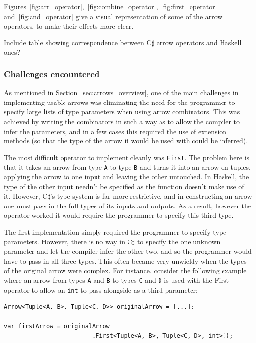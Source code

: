 \documentclass[12pt,twoside,notitlepage]{report}
\begin{document}
Figures~\ref{fig:arr_operator},~\ref{fig:combine_operator},~\ref{fig:first_operator} and~\ref{fig:and_operator} give a visual representation of some of the arrow operators, to make their effects more clear.

Include table showing correspondence between C$\sharp$ arrow operators and Haskell ones?

\subsubsection{Challenges encountered} \label{sec:simple_arrow_challenges}

As mentioned in Section~\ref{sec:arrows_overview}, one of the main challenges in implementing usable arrows was eliminating the need for the programmer to specify large lists of type parameters when using arrow combinators. This was achieved by writing the combinators in such a way as to allow the compiler to infer the parameters, and in a few cases this required the use of extension methods (so that the type of the arrow it would be used with could be inferred).

The most difficult operator to implement cleanly was \texttt{First}. The problem here is that it takes an arrow from type \texttt{A} to type \texttt{B} and turns it into an arrow on tuples, applying the arrow to one input and leaving the other untouched. In Haskell, the type of the other input needn't be specified as the function doesn't make use of it. However, C$\sharp$'s type system is far more restrictive, and in constructing an arrow one must pass in the full types of its inputs and outputs. As a result, however the operator worked it would require the programmer to specify this third type.

The first implementation simply required the programmer to specify type parameters. However, there is no way in C$\sharp$ to specify the one unknown parameter and let the compiler infer the other two, and so the programmer would have to pass in all three types. This often became very unwieldy when the types of the original arrow were complex. For instance, consider the following example where an arrow from types \texttt{A} and \texttt{B} to types \texttt{C} and \texttt{D} is used with the First operator to allow an \texttt{int} to pass alongside as a third parameter:

\begin{lstlisting}[language={[Sharp]C}]
Arrow<Tuple<A, B>, Tuple<C, D>> originalArrow = [...];

var firstArrow = originalArrow
                         .First<Tuple<A, B>, Tuple<C, D>, int>();
\end{lstlisting}
\end{document}
